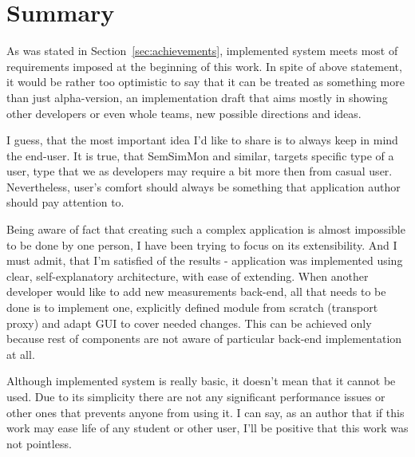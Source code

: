 %


\section{Summary}
\label{sec:summary}
 
As was stated in Section~\ref{sec:achievements}, implemented system meets most of requirements imposed at the beginning of this work. In spite of above statement, it would be rather too optimistic to say that it can be treated as something more than just alpha-version, an implementation draft that aims mostly in showing other developers or even whole teams, new possible directions and ideas.

I guess, that the most important idea I\rq{}d like to share is to always keep in mind the end-user. It is true, that SemSimMon and similar, targets specific type of a user, type that we as developers may require a bit more then from casual user. Nevertheless, user\rq{}s comfort should always be something that application author should pay attention to.

Being aware of fact that creating such a complex application is almost impossible to be done by one person, I have been trying to focus on its extensibility. And I must admit, that I\rq{}m satisfied of the results - application was implemented using clear, self-explanatory architecture, with ease of extending. When another developer would like to add new measurements back-end, all that needs to be done is to implement one, explicitly defined  module from scratch (transport proxy) and adapt GUI to cover needed changes. This can be achieved only because rest of components are not aware of particular back-end implementation at all.

Although implemented system is really basic, it doesn\rq{}t mean that it cannot be used. Due to its simplicity there are not any significant performance issues or other ones that prevents anyone from using it. I can say, as an author that if this work may ease life of any student or other user, I\rq{}ll be positive that this work was not pointless. 
 